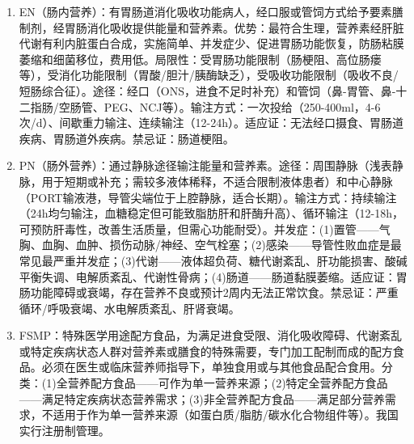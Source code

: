 {\begin{enumerate}[leftmargin=*, itemsep=5pt]
    \item EN（肠内营养）：有胃肠道消化吸收功能病人，经口服或管饲方式给予要素膳制剂，经胃肠消化吸收提供能量和营养素。优势：最符合生理，营养素经肝脏代谢有利内脏蛋白合成，实施简单、并发症少、促进胃肠功能恢复，防肠粘膜萎缩和细菌移位，费用低。局限性：受胃肠功能限制（肠梗阻、高位肠瘘等），受消化功能限制（胃酸/胆汁/胰酶缺乏），受吸收功能限制（吸收不良/短肠综合征）。途径：经口（ONS，进食不足时补充）和管饲（鼻-胃管、鼻-十二指肠/空肠管、PEG、NCJ等）。输注方式：一次投给（250-400ml，4-6次/d）、间歇重力输注、连续输注（12-24h）。适应证：无法经口摄食、胃肠道疾病、胃肠道外疾病。禁忌证：肠道梗阻。

    \item PN（肠外营养）：通过静脉途径输注能量和营养素。途径：周围静脉（浅表静脉，用于短期或补充；需较多液体稀释，不适合限制液体患者）和中心静脉（PORT输液港，导管尖端位于上腔静脉，适合长期）。输注方式：持续输注（24h均匀输注，血糖稳定但可能致脂肪肝和肝酶升高）、循环输注（12-18h，可预防肝毒性，改善生活质量，但需心功能耐受）。并发症：(1)置管——气胸、血胸、血肿、损伤动脉/神经、空气栓塞；(2)感染——导管性败血症是最常见最严重并发症；(3)代谢——液体超负荷、糖代谢紊乱、肝功能损害、酸碱平衡失调、电解质紊乱、代谢性骨病；(4)肠道——肠道黏膜萎缩。适应证：胃肠功能障碍或衰竭，存在营养不良或预计2周内无法正常饮食。禁忌证：严重循环/呼吸衰竭、水电解质紊乱、肝肾衰竭。

    \item FSMP：特殊医学用途配方食品，为满足进食受限、消化吸收障碍、代谢紊乱或特定疾病状态人群对营养素或膳食的特殊需要，专门加工配制而成的配方食品。必须在医生或临床营养师指导下，单独食用或与其他食品配合食用。分类：(1)全营养配方食品——可作为单一营养来源；(2)特定全营养配方食品——满足特定疾病状态营养需求；(3)非全营养配方食品——满足部分营养需求，不适用于作为单一营养来源（如蛋白质/脂肪/碳水化合物组件等）。我国实行注册制管理。
\end{enumerate}

}
\newpage
